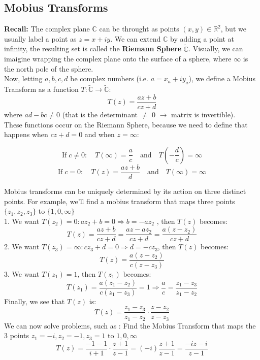 \documentclass[a4paper, 10pt]{article}
\begin{document}
\subsection{Mobius Transforms}
\textbf{Recall:} The complex plane $\mathbb{C}$ can be throught as points $(x,y) \in \mathbb{R}^2$, but we usually label a point as $z = x+iy$.
We can extend $\mathbb{C}$ by adding a point at infinity, the resulting set is called the \textbf{Riemann Sphere} $\tilde{\mathbb{C}}$.
Visually, we can imaigine wrapping the complex plane onto the surface of a sphere, where $\infty$ is the north pole of the sphere. \\[2ex]
\noindent Now, letting $a,b,c,d$ be complex numbers (i.e. $ a = x_a + iy_a$), we define a Mobius Transform as a function $T:\tilde{\mathbb{C}} \to \tilde{\mathbb{C}}:$
$$T(z) = \frac{az + b}{cz +d}$$
where $ad -bc \neq 0$ (that is the determinant $\neq$ 0 $\rightarrow$ matrix is invertible). \\
These functions occur on the Riemann Sphere, because we need to define that happens when $cz + d = 0$ and when $z = \infty$:

$$\text{If} \;c \neq 0: \quad T(\infty) = \frac{a}{c} \quad \text{and} \quad T\left(-\frac{d}{c}\right) = \infty$$
$$\text{If} \;c = 0: \quad T(z) = \frac{az + b}{d}\quad \text{and} \quad T(\infty) = \infty$$

\noindent Mobius transforms can be  uniquely determined by its action on three distinct points. For example, we'll find a mobius transform that maps three points $\{z_1, z_2, z_3\}$ to $\{1,0,\infty\}$ \\[2ex]
1. We want $T(z_2) = 0 : az_2 + b = 0 \Rightarrow b= -az_2$ , then $T(z)$ becomes:
$$T(z) = \frac{az + b}{cz + d} = \frac{az -az_2}{cz+d} = \frac{a(z-z_2)}{cz + d}$$
2. We want $T(z_3) = \infty : cz_3 + d = 0 \Rightarrow d = -cz_3$, then $T(z)$ becomes:
$$T(z) = \frac{a(z - z_2)}{c(z - z_3)}$$
3. We want $T(z_1) = 1$, then $T(z_1)$ becomes:
$$T(z_1) = \frac{a(z_1 - z_2)}{c(z_1 - z_3)} = 1 \Rightarrow \frac{a}{c} = \frac{z_1 - z_3}{z_1 - z_2}$$
Finally, we see that $T(z)$ is:
$$T(z) = \frac{z_1 - z_3}{z_1 - z_2}\cdot \frac{z - z_2}{z - z_3} $$
We can now solve problems, such as : Find the Mobius Transform that maps the 3 points $z_1 = -i, z_2 = -1, z_3 = 1$ to $1,0,\infty$
$$T(z) = \frac{-1 -1}{i + 1} \cdot \frac{z + 1}{z-1} = (-i)\frac{z+1}{z-1} = \frac{-iz -i}{z-1}$$

\pagebreak
\end{document}
